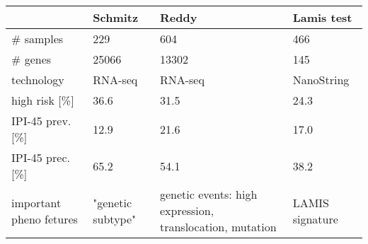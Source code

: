 \begin{table}[ht]
\small
\centering
\begin{tabular}{L{.18\textwidth}||R{.2\textwidth}|R{.28\textwidth}|R{.18\textwidth}}
  & Schmitz \cite{schmitz18} & Reddy \cite{reddy17} & Lamis test \cite{staiger20} \\
  \hline
  \# samples & 229 & 604 & 466 \\
  \# genes & 25066 & 13302 & 145 \\
  technology & RNA-seq & RNA-seq & NanoString \\
  high risk [\%] & 36.6 & 31.5\footnotemark{} & 24.3 \\
  IPI-45 prev. [\%] & 12.9 & 21.6 & 17.0 \\
  IPI-45 prec. [\%] & 65.2 & 54.1 & 38.2 \\
  important pheno fetures & "genetic subtype" & genetic events: high expression, translocation, mutation & LAMIS signature
\end{tabular}
\end{table}
